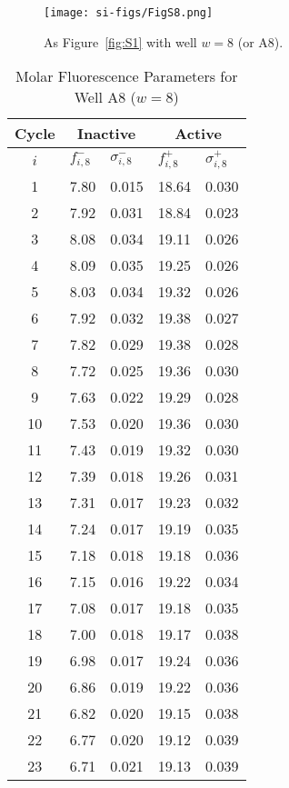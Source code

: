                 \begin{figure}
                    \centering
                    \texttt{[image: si-figs/FigS8.png]}
                    \caption{
                        As Figure~\ref{fig:S1} with well $w=8$ (or A8).
                    }
                \end{figure}
                \clearpage
    \begin{table}
        \caption{Molar Fluorescence Parameters for Well A8 ($w=8$)}
        \centering
        \begin{tabular}{c|ll|ll}
            Cycle & \multicolumn{2}{c|}{Inactive} & \multicolumn{2}{c}{Active} \\
            \hline
            $i$ & $f_{i,8}^{-}$ & $\sigma_{i,8}^{-}$ &  $f_{i,8}^{+}$ & $\sigma_{i,8}^{+}$ \\
            \hline
    1 & 7.80 & 0.015 & 18.64 & 0.030 \\
2 & 7.92 & 0.031 & 18.84 & 0.023 \\
3 & 8.08 & 0.034 & 19.11 & 0.026 \\
4 & 8.09 & 0.035 & 19.25 & 0.026 \\
5 & 8.03 & 0.034 & 19.32 & 0.026 \\
6 & 7.92 & 0.032 & 19.38 & 0.027 \\
7 & 7.82 & 0.029 & 19.38 & 0.028 \\
8 & 7.72 & 0.025 & 19.36 & 0.030 \\
9 & 7.63 & 0.022 & 19.29 & 0.028 \\
10 & 7.53 & 0.020 & 19.36 & 0.030 \\
11 & 7.43 & 0.019 & 19.32 & 0.030 \\
12 & 7.39 & 0.018 & 19.26 & 0.031 \\
13 & 7.31 & 0.017 & 19.23 & 0.032 \\
14 & 7.24 & 0.017 & 19.19 & 0.035 \\
15 & 7.18 & 0.018 & 19.18 & 0.036 \\
16 & 7.15 & 0.016 & 19.22 & 0.034 \\
17 & 7.08 & 0.017 & 19.18 & 0.035 \\
18 & 7.00 & 0.018 & 19.17 & 0.038 \\
19 & 6.98 & 0.017 & 19.24 & 0.036 \\
20 & 6.86 & 0.019 & 19.22 & 0.036 \\
21 & 6.82 & 0.020 & 19.15 & 0.038 \\
22 & 6.77 & 0.020 & 19.12 & 0.039 \\
23 & 6.71 & 0.021 & 19.13 & 0.039 \\

\end{tabular}
\end{table}
